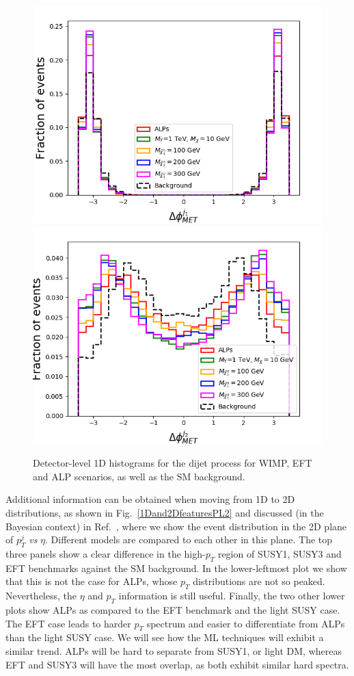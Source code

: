 \documentclass[prd,aps,letterpaper,floatfix,superscriptaddress,preprintnumbers,twocolumn,10pt,nofootinbib]{revtex4-1}
\begin{document}
\begin{figure}[t!]
\includegraphics[scale=0.4]{figures/deltaphiMETj1allsbdelphesdijet.png}
\includegraphics[scale=0.4]{figures/deltaphiMETj2allsbdelphesdijet.png}
\caption{Detector-level 1D histograms for the dijet process for WIMP, EFT and ALP scenarios, as well as the SM background.\label{1Dand2DfeaturesDLdijet}}
\end{figure}
Additional information can be obtained when moving from 1D to 2D distributions, as shown in Fig.~\ref{1Dand2DfeaturesPL2} and discussed (in the Bayesian context) in Ref.~\cite{2D}, where we show the event distribution in the 2D plane of $p_T^j$ {\it vs} $\eta$. Different models are compared to each other in this plane. The top three panels show a clear difference in the high-$p_T$ region of SUSY1, SUSY3 and EFT benchmarks against the SM background. In the lower-leftmost plot we show that this is not the case for ALPs, whose $p_T$ distributions are not so peaked. Nevertheless, the $\eta $ and $p_T$ information is still useful. Finally, the two other lower plots show ALPs as compared to the EFT benchmark and the light SUSY case. The EFT case leads to harder $p_T$ spectrum and easier to differentiate from ALPs than the light SUSY case. We will see how the ML techniques will exhibit a similar trend. ALPs will be hard to separate from SUSY1, or light DM, whereas EFT and SUSY3 will have the most overlap, as both exhibit similar hard spectra. 
\end{document}
